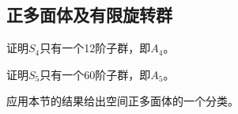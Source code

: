 \subsection{正多面体及有限旋转群}
\begin{prob}
证明$S_{4}$只有一个12阶子群，即$A_{4}$。
\end{prob}
\begin{prob}
证明$S_{5}$只有一个60阶子群，即$A_{5}$。
\end{prob}
\begin{prob}
应用本节的结果给出空间正多面体的一个分类。
\end{prob}
